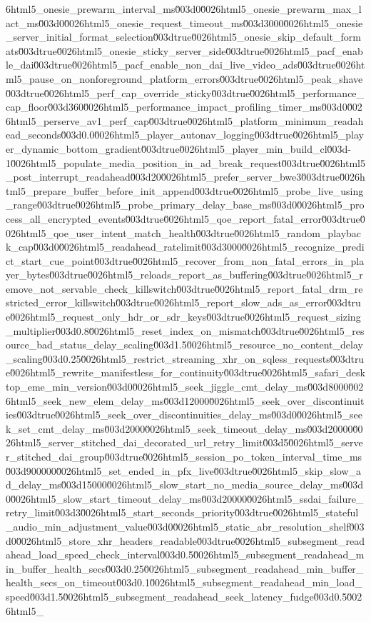 {6html5_onesie_prewarm_interval_ms\u003d0\u0026html5_onesie_prewarm_max_lact_ms\u003d0\u0026html5_onesie_request_timeout_ms\u003d3000\u0026html5_onesie_server_initial_format_selection\u003dtrue\u0026html5_onesie_skip_default_formats\u003dtrue\u0026html5_onesie_sticky_server_side\u003dtrue\u0026html5_pacf_enable_dai\u003dtrue\u0026html5_pacf_enable_non_dai_live_video_ads\u003dtrue\u0026html5_pause_on_nonforeground_platform_errors\u003dtrue\u0026html5_peak_shave\u003dtrue\u0026html5_perf_cap_override_sticky\u003dtrue\u0026html5_performance_cap_floor\u003d360\u0026html5_performance_impact_profiling_timer_ms\u003d0\u0026html5_perserve_av1_perf_cap\u003dtrue\u0026html5_platform_minimum_readahead_seconds\u003d0.0\u0026html5_player_autonav_logging\u003dtrue\u0026html5_player_dynamic_bottom_gradient\u003dtrue\u0026html5_player_min_build_cl\u003d-1\u0026html5_populate_media_position_in_ad_break_request\u003dtrue\u0026html5_post_interrupt_readahead\u003d20\u0026html5_prefer_server_bwe3\u003dtrue\u0026html5_prepare_buffer_before_init_append\u003dtrue\u0026html5_probe_live_using_range\u003dtrue\u0026html5_probe_primary_delay_base_ms\u003d0\u0026html5_process_all_encrypted_events\u003dtrue\u0026html5_qoe_report_fatal_error\u003dtrue\u0026html5_qoe_user_intent_match_health\u003dtrue\u0026html5_random_playback_cap\u003d0\u0026html5_readahead_ratelimit\u003d3000\u0026html5_recognize_predict_start_cue_point\u003dtrue\u0026html5_recover_from_non_fatal_errors_in_player_bytes\u003dtrue\u0026html5_reloads_report_as_buffering\u003dtrue\u0026html5_remove_not_servable_check_killswitch\u003dtrue\u0026html5_report_fatal_drm_restricted_error_killswitch\u003dtrue\u0026html5_report_slow_ads_as_error\u003dtrue\u0026html5_request_only_hdr_or_sdr_keys\u003dtrue\u0026html5_request_sizing_multiplier\u003d0.8\u0026html5_reset_index_on_mismatch\u003dtrue\u0026html5_resource_bad_status_delay_scaling\u003d1.5\u0026html5_resource_no_content_delay_scaling\u003d0.25\u0026html5_restrict_streaming_xhr_on_sqless_requests\u003dtrue\u0026html5_rewrite_manifestless_for_continuity\u003dtrue\u0026html5_safari_desktop_eme_min_version\u003d0\u0026html5_seek_jiggle_cmt_delay_ms\u003d8000\u0026html5_seek_new_elem_delay_ms\u003d12000\u0026html5_seek_over_discontinuities\u003dtrue\u0026html5_seek_over_discontinuities_delay_ms\u003d0\u0026html5_seek_set_cmt_delay_ms\u003d2000\u0026html5_seek_timeout_delay_ms\u003d20000\u0026html5_server_stitched_dai_decorated_url_retry_limit\u003d5\u0026html5_server_stitched_dai_group\u003dtrue\u0026html5_session_po_token_interval_time_ms\u003d900000\u0026html5_set_ended_in_pfx_live\u003dtrue\u0026html5_skip_slow_ad_delay_ms\u003d15000\u0026html5_slow_start_no_media_source_delay_ms\u003d0\u0026html5_slow_start_timeout_delay_ms\u003d20000\u0026html5_ssdai_failure_retry_limit\u003d3\u0026html5_start_seconds_priority\u003dtrue\u0026html5_stateful_audio_min_adjustment_value\u003d0\u0026html5_static_abr_resolution_shelf\u003d0\u0026html5_store_xhr_headers_readable\u003dtrue\u0026html5_subsegment_readahead_load_speed_check_interval\u003d0.5\u0026html5_subsegment_readahead_min_buffer_health_secs\u003d0.25\u0026html5_subsegment_readahead_min_buffer_health_secs_on_timeout\u003d0.1\u0026html5_subsegment_readahead_min_load_speed\u003d1.5\u0026html5_subsegment_readahead_seek_latency_fudge\u003d0.5\u0026html5_}
